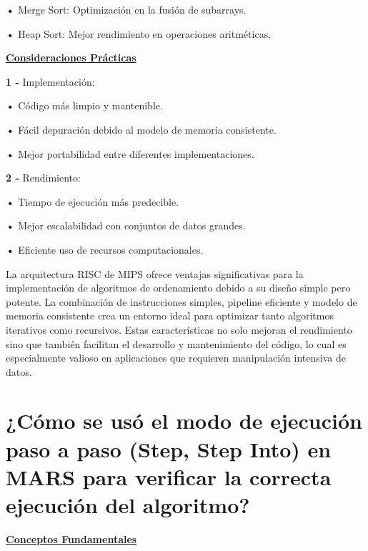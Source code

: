 \documentclass{article}
\begin{document}
\textbf{•   } { Merge Sort: Optimización en la fusión de subarrays.}

\textbf{•   } { Heap Sort: Mejor rendimiento en operaciones aritméticas.}


\quad

\textbf{\underline{Consideraciones Prácticas}}

\quad

\textbf{1 -  } { Implementación:}

\quad

\textbf{•   } {Código más limpio y mantenible.}

\textbf{•   } { Fácil depuración debido al modelo de memoria consistente.}

\textbf{•   } { Mejor portabilidad entre diferentes implementaciones.}

\quad

\textbf{2 -  } { Rendimiento:}

\quad

\textbf{•   } { Tiempo de ejecución más predecible.}

\textbf{•   } { Mejor escalabilidad con conjuntos de datos grandes.}

\textbf{•   } { Eficiente uso de recursos computacionales.}

\quad

{La arquitectura RISC de MIPS ofrece ventajas significativas para la implementación de algoritmos de ordenamiento debido a su diseño simple pero potente. La combinación de instrucciones simples, pipeline eficiente y modelo de memoria consistente crea un entorno ideal para optimizar tanto algoritmos iterativos como recursivos. Estas características no solo mejoran el rendimiento sino que también facilitan el desarrollo y mantenimiento del código, lo cual es especialmente valioso en aplicaciones que requieren manipulación intensiva de datos.}

\quad
\newpage








\section{¿Cómo se usó el modo de ejecución paso a paso (Step, Step Into) en MARS para verificar la correcta ejecución del algoritmo?}

\quad

\textbf{\underline{Conceptos Fundamentales}}
\end{document}
